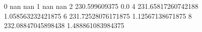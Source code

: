 0 nan nan
1 nan nan
2 230.599609375 0.0
4 231.65817260742188 1.058563232421875
6 231.72528076171875 1.12567138671875
8 232.08847045898438 1.488861083984375
